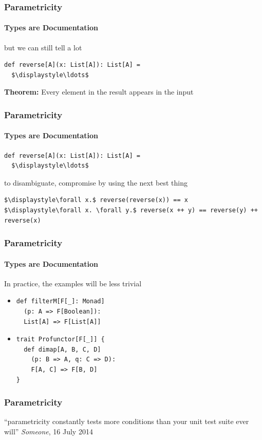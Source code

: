 \begin{frame}[fragile]
\frametitle{Parametricity}
\framesubtitle{Types are Documentation}
\begin{block}{but we can still tell a lot}
\begin{lstlisting}[style=scala,mathescape]
def reverse[A](x: List[A]): List[A] =
  $\displaystyle\ldots$
\end{lstlisting}
\end{block}
\textbf{Theorem:} Every element in the result appears in the input
\end{frame}


\begin{frame}[fragile]
\frametitle{Parametricity}
\framesubtitle{Types are Documentation}
\begin{lstlisting}[style=scala,mathescape]
def reverse[A](x: List[A]): List[A] =
  $\displaystyle\ldots$
\end{lstlisting}
\begin{block}{to disambiguate, compromise by using the next best thing}
\begin{lstlisting}[style=scala,mathescape]
$\displaystyle\forall x.$ reverse(reverse(x)) == x
$\displaystyle\forall x. \forall y.$ reverse(x ++ y) == reverse(y) ++ reverse(x)
\end{lstlisting}
\end{block}
\end{frame}


\begin{frame}[fragile]
\frametitle{Parametricity}
\framesubtitle{Types are Documentation}
\begin{block}{In practice, the examples will be less trivial}
\begin{itemize} 
  \item<1-> \begin{lstlisting}[style=scala]
def filterM[F[_]: Monad]
  (p: A => F[Boolean]):
  List[A] => F[List[A]]
        \end{lstlisting}

  \item<2-> \begin{lstlisting}[style=scala]
trait Profunctor[F[_]] {
  def dimap[A, B, C, D]
    (p: B => A, q: C => D): 
    F[A, C] => F[B, D]
}  
        \end{lstlisting}
\end{itemize}
\end{block}
\end{frame}


\begin{frame}[fragile]
\frametitle{Parametricity}
``parametricity constantly tests more conditions than your unit test suite ever will'' \textemdash \emph{Someone}, 16 July 2014
\end{frame}
